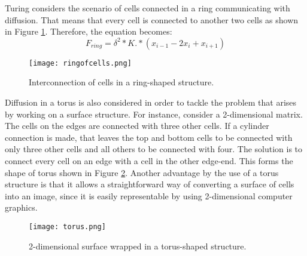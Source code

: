 Turing considers the scenario of cells connected in a ring communicating with diffusion. 
That means that every cell is connected to another two cells as shown in Figure \ref{ringCells}. Therefore, the equation becomes:
\begin{equation}
\label{diffeq}
F_{ring}=\delta^2*K.*(x_{i-1}-2x_i+x_{i+1})
\end{equation}

\begin{figure}
\centering
\texttt{[image: ringofcells.png]}
\caption{Interconnection of cells in a ring-shaped structure.}
\label{ringCells}
\end{figure}

Diffusion in a torus is also considered in order to tackle the problem that arises by working on a surface structure. For instance, consider a 2-dimensional matrix. The cells on the edges are connected with three other cells. If a cylinder connection is made, that leaves the top and bottom cells to be connected with only three other cells and all others to be connected with four. The solution is to connect every cell on an edge with a cell in the other edge-end. This forms the shape of torus shown in Figure \ref{torus}. Another advantage by the use of a torus structure is that it allows a straightforward way of converting a surface of cells into an image, since it is easily representable by using 2-dimensional computer graphics.

\begin{figure}
\centering
\texttt{[image: torus.png]}
\caption{2-dimensional surface wrapped in a torus-shaped structure.}
\label{torus}
\end{figure}

